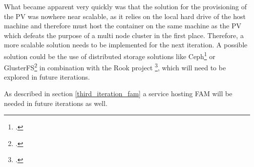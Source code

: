 What became apparent very quickly was that the solution for the provisioning of the \ac{PV} was nowhere near scalable,
as it relies on the local hard drive of the host machine and therefore must host the container on the same machine as the \ac{PV} which defeats the purpose of a multi node cluster in the first place.
Therefore, a more scalable solution needs to be implemented for the next iteration.
A possible solution could be the use of distributed storage solutions like Ceph\footcite{CephIoHome} or GlusterFS\footcite{Gluster}  in combination with the Rook project \footcite{Rook},
which will need to be explored in future iterations.


As described in section \ref{third_iteration_fam} a service hosting \ac{FAM} will be needed in future iterations as well.
